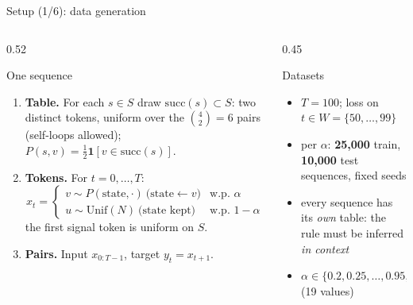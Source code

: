 \documentclass[aspectratio=169,11pt]{beamer}
\newcommand{\1}{\mathbf{1}}
\newcommand{\succc}{\mathrm{succ}}
\begin{document}
\begin{frame}{Setup (1/6): data generation}
\small
\begin{columns}[T]
\begin{column}{0.52\textwidth}
\begin{block}{One sequence}
\begin{enumerate}
\item \textbf{Table.} For each $s\in S$ draw $\succc(s)\subset S$: two distinct tokens, uniform over the
$\binom42=6$ pairs (self-loops allowed); $P(s,v)=\tfrac12\1[v\in\succc(s)]$.
\item \textbf{Tokens.} For $t=0,\dots,T$:
\[
x_t=\begin{cases}
v\sim P(\text{state},\cdot)\ \text{(state}\gets v) & \text{w.p. } \alpha\\
u\sim\mathrm{Unif}(N)\ \text{(state kept)} & \text{w.p. } 1-\alpha
\end{cases}
\]
the first signal token is uniform on $S$.
\item \textbf{Pairs.} Input $x_{0:T-1}$, target $y_t=x_{t+1}$.
\end{enumerate}
\end{block}
\end{column}
\begin{column}{0.45\textwidth}
\begin{block}{Datasets}
\begin{itemize}
\item $T=100$; loss on $t\in W=\{50,\dots,99\}$
\item per $\alpha$: \textbf{25{,}000} train, \textbf{10{,}000} test sequences, fixed seeds
\item every sequence has its \emph{own} table: the rule must be inferred \emph{in context}
\item $\alpha\in\{0.2,0.25,\dots,0.95,0.975,0.99,1\}$ (19 values)
\end{itemize}
\end{block}
\end{column}
\end{columns}
\end{frame}
\end{document}
